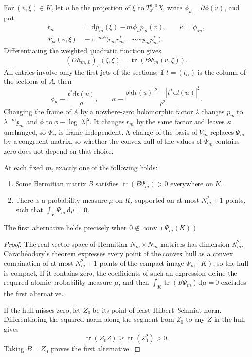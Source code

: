 For $(v,\xi)\in K$, let $u$ be the projection of $\xi$ to $T_x^{1,0}X$, write $\phi_u=\partial\phi(u)$, and put
\begin{align*}
 r_m&=\mathrm dp_m(\xi)-m\phi_u p_m(v),\qquad
 \kappa=\phi_{u\bar u},\\
 \Psi_m(v,\xi)&=\mathrm e^{-m\phi}
       \bigl(r_mr_m^*-m\kappa p_m p_m^*\bigr).
\end{align*}
Differentiating the weighted quadratic function gives
\begin{equation}\label{eq:first-jet-levi-matrix}
 (D h_{m,B})_v(\xi,\xi)=\operatorname{tr}(B\Psi_m(v,\xi)).
\end{equation}
All entries involve only the first jets of the sections: if $t=(t_\alpha)$ is the column of the sections of $A$, then
\[
 \phi_u=\frac{t^*\mathrm dt(u)}{\rho},\qquad
 \kappa=\frac{\rho|\mathrm dt(u)|^2-|t^*\mathrm dt(u)|^2}{\rho^2}.
\]
Changing the frame of $A$ by a nowhere-zero holomorphic factor $\lambda$ changes $p_m$ to $\lambda^{-m}p_m$ and $\phi$ to $\phi-\log|\lambda|^2$. It changes $r_m$ by the same factor and leaves $\kappa$ unchanged, so $\Psi_m$ is frame independent. A change of the basis of $V_m$ replaces $\Psi_m$ by a congruent matrix, so whether the convex hull of the values of $\Psi_m$ contains zero does not depend on that choice.

\begin{proposition}\label{prop:first-jet-finite-alternative}
At each fixed $m$, exactly one of the following holds:
\begin{enumerate}
 \item Some Hermitian matrix $B$ satisfies $\operatorname{tr}(B\Psi_m)>0$ everywhere on $K$.
 \item There is a probability measure $\mu$ on $K$, supported on at most $N_m^2+1$ points, such that $\int_K\Psi_m\,\mathrm d\mu=0$.
\end{enumerate}
The first alternative holds precisely when $0\notin\operatorname{conv}(\Psi_m(K))$.
\end{proposition}
\begin{proof}
The real vector space of Hermitian $N_m\times N_m$ matrices has dimension $N_m^2$. Carath\'eodory's theorem expresses every point of the convex hull as a convex combination of at most $N_m^2+1$ points of the compact image $\Psi_m(K)$, so the hull is compact. If it contains zero, the coefficients of such an expression define the required atomic probability measure $\mu$, and then $\int_K\operatorname{tr}(B\Psi_m)\,\mathrm d\mu=0$ excludes the first alternative.

If the hull misses zero, let $Z_0$ be its point of least Hilbert--Schmidt norm. Differentiating the squared norm along the segment from $Z_0$ to any $Z$ in the hull gives
\[
 \operatorname{tr}(Z_0Z)\geq\operatorname{tr}(Z_0^2)>0.
\]
Taking $B=Z_0$ proves the first alternative.
\end{proof}

